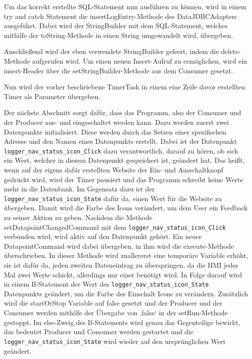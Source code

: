Um das korrekt erstellte SQL-Statement nun ausführen zu können, wird in einem try and catch Statement die insertLogEntry-Methode des DataJDBCAdapters ausgeführt. Dabei wird der StringBuilder mit dem SQL-Statement, welches mithilfe der toString-Methode in einen String umgewandelt wird, übergeben.
 
Anschließend wird der eben verwendete StringBuilder geleert, indem die delete-Methode aufgerufen wird. Um einen neuen Insert-Aufruf zu ermöglichen, wird ein insert-Header über die setStringBuilder-Methode aus dem Consumer gesetzt.
 
Nun wird der vorher beschriebene TimerTask in einem eine Zeile davor erstellten Timer als Parameter übergeben.
 
Der nächste Abschnitt sorgt dafür, dass das Programm, also der Consumer und der Producer aus- und eingeschaltet werden kann. Dazu werden zuerst zwei Datenpunkte initialisiert. Diese werden durch das Setzen einer spezifischen Adresse und den Namen eines Datenpunkts erstellt. Dabei ist der Datenpunkt \texttt{logger\_nav\_status\_icon\_Click} dazu verantwortlich, darauf zu hören, ob sich ein Wert, welcher in diesem Datenpunkt gespeichert ist, geändert hat. Das heißt, wenn auf der eigens dafür erstellten Website der Ein- und Ausschaltknopf gedrückt wird, wird der Timer pausiert und das Programm schreibt keine Werte mehr in die Datenbank. Im Gegensatz dazu ist der \texttt{logger\_nav\_status\_icon\_State} dafür da, einen Wert für die Website zu übergeben. Damit wird die Farbe des Icons verändert, um dem User ein Feedback zu seiner Aktion zu geben.
Nachdem die Methode setDatapointChangedCommand mit dem \texttt{logger\_nav\_status\_icon\_Click} verbunden wird, wird aktiv auf den Datenpunkt gehört. Ein neuer DatapointCommand wird dabei übergeben, in ihm wird die execute-Methode überschrieben. In dieser Methode wird zuallererst eine temporäre Variable erhöht, sie ist dafür da, jeden zweiten Dateneintrag zu überspringen, da die HMI jedes Mal zwei Werte schickt, allerdings nur einer benötigt wird. In Folge darauf wird in einem If-Statement der Wert des \texttt{logger\_nav\_status\_icon\_State} Datenpunkts geändert, um die Farbe des Einschalt Icons zu verändern. Zusätzlich wird die startOrStop Variable auf false gesetzt und der Producer und der Consumer werden mithilfe der Übergabe von ‚false‘ in der setRun-Methode gestoppt. Im else-Zweig des If-Statements wird genau das Gegenteilige bewirkt, das bedeutet Producer und Consumer werden gestartet und die \texttt{logger\_nav\_status\_icon\_State} wird wieder auf den ursprünglichen Wert geändert.
 
